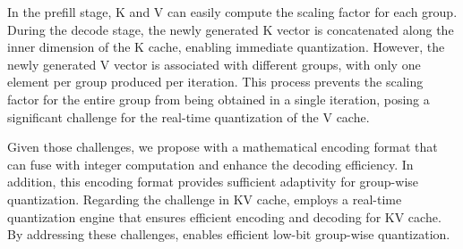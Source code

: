 In the prefill stage, K and V can easily compute the scaling factor for each group. 
During the decode stage, the newly generated K vector is concatenated along the inner dimension of the K cache, enabling immediate quantization. 
However, the newly generated V vector is associated with different groups, with only one element per group produced per iteration. This process prevents the scaling factor for the entire group from being obtained in a single iteration, posing a significant challenge for the real-time quantization of the V cache.





Given those challenges, we propose \proj with a mathematical encoding format that can fuse with integer computation and enhance the decoding efficiency.
In addition, this encoding format provides sufficient adaptivity for group-wise quantization.
Regarding the challenge in KV cache, \proj employs a real-time quantization engine that ensures efficient encoding and decoding for KV cache.
By addressing these challenges, \proj enables efficient low-bit group-wise quantization.


